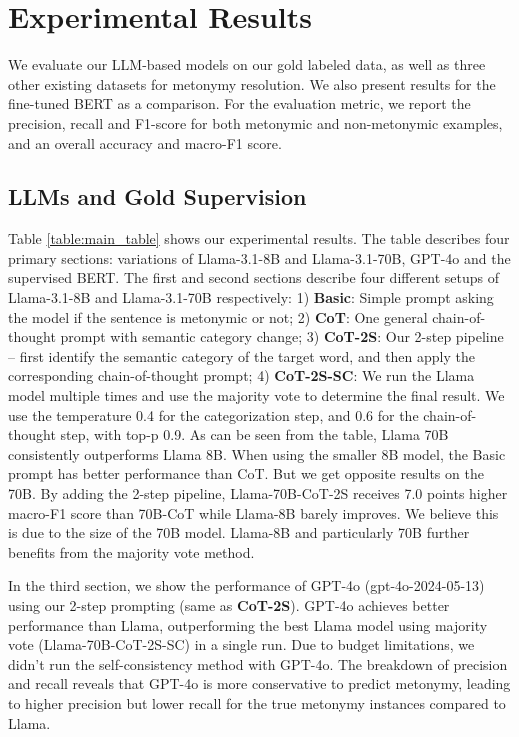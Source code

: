 \documentclass[11pt]{article}
\begin{document}
\section{Experimental Results}

We evaluate our LLM-based models on our gold labeled data, as well as three other existing datasets for metonymy resolution. We also present results for the fine-tuned BERT as a comparison. For the evaluation metric, we report the precision, recall and F1-score for both metonymic and non-metonymic examples, and an overall accuracy and macro-F1 score.

\subsection{LLMs and Gold Supervision}
Table \ref{table:main_table} shows our experimental results.
The table describes four primary sections: variations of Llama-3.1-8B and Llama-3.1-70B, GPT-4o and the supervised BERT. The first and second sections describe four different setups of Llama-3.1-8B and Llama-3.1-70B respectively: 1) \textbf{Basic}: Simple prompt asking the model if the sentence is metonymic or not; 2) \textbf{CoT}: One general chain-of-thought prompt with semantic category change; 3) \textbf{CoT-2S}: Our 2-step pipeline -- first identify the semantic category of the target word, and then apply the corresponding chain-of-thought prompt; 4) \textbf{CoT-2S-SC}: We run the Llama model multiple times and use the majority vote to determine the final result. We use the temperature 0.4 for the categorization step, and 0.6 for the chain-of-thought step, with top-p 0.9. As can be seen from the table, Llama 70B consistently outperforms Llama 8B. When using the smaller 8B model, the Basic prompt has better performance than CoT. But we get opposite results on the 70B. By adding the 2-step pipeline, Llama-70B-CoT-2S receives 7.0 points higher macro-F1 score than 70B-CoT while Llama-8B barely improves. We believe this is due to the size of the 70B model. Llama-8B and particularly 70B further benefits from the majority vote method.

In the third section, we show the performance of GPT-4o (gpt-4o-2024-05-13) using our 2-step prompting (same as \textbf{CoT-2S}). GPT-4o achieves better performance than Llama, outperforming the best Llama model using majority vote (Llama-70B-CoT-2S-SC) in a single run. Due to budget limitations, we didn't run the self-consistency method with GPT-4o. The breakdown of precision and recall reveals that GPT-4o is more conservative to predict metonymy, leading to higher precision but lower recall for the true metonymy instances compared to Llama. 
\end{document}
